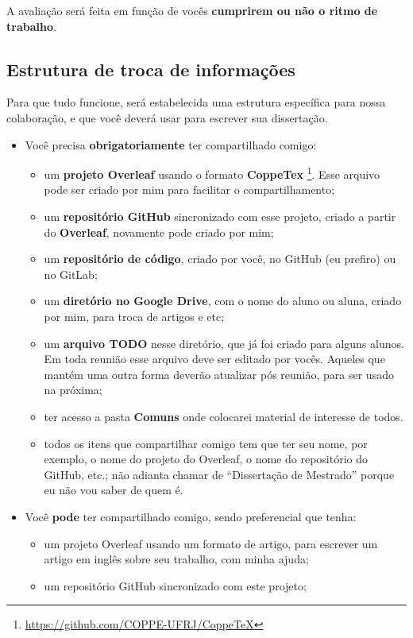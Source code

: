 \documentclass{article}
\begin{document}
A avaliação  será feita em função de vocês \textbf{cumprirem ou não o ritmo de trabalho}.

\subsection{Estrutura de troca de informações}

Para que tudo funcione, será estabelecida uma estrutura específica para nossa colaboração, e que você deverá usar para escrever sua dissertação.

\begin{itemize}
    \item Você precisa \textbf{obrigatoriamente} ter compartilhado comigo:
    \begin{itemize}
        \item um \textbf{projeto Overleaf} usando o formato \textbf{CoppeTex} \footnote{\url{https://github.com/COPPE-UFRJ/CoppeTeX}}. Esse arquivo pode ser criado por mim para facilitar o compartilhamento;
        \item um \textbf{repositório GitHub} sincronizado com esse projeto, criado a partir do \textbf{Overleaf}, novamente pode criado por mim;
        \item um \textbf{repositório de código}, criado por você, no GitHub (eu prefiro) ou no GitLab;
        \item um \textbf{diretório no Google Drive}, com o nome do aluno ou aluna, criado por mim, para troca de artigos e etc;
        \item um \textbf{arquivo TODO} nesse diretório, que já foi criado para alguns alunos. Em toda reunião esse arquivo deve ser editado por vocês. Aqueles que mantém uma outra forma deverão atualizar pós reunião, para ser usado na próxima;
        \item ter acesso a pasta \textbf{Comuns} onde colocarei material de interesse de todos.
        \item todos os itens que compartilhar comigo tem que ter seu nome, por exemplo, o nome do projeto do Overleaf, o nome do repositório do GitHub, etc.; não adianta chamar de ``Dissertação de Mestrado'' porque eu não vou saber de quem é.
    \end{itemize}
    \item Você \textbf{pode} ter compartilhado comigo, sendo preferencial que tenha:
    \begin{itemize}
        \item um projeto Overleaf usando um formato de artigo, para escrever um artigo em inglês sobre seu trabalho, com minha ajuda;
        \item um repositório GitHub sincronizado com este projeto;
    \end{itemize}
\end{itemize}
\end{document}
